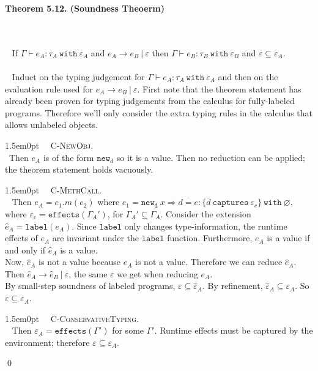 \documentclass{llncs}
\newcommand{\keywadj}[1]{\mathtt{#1}}
\newcommand{\keyw}[1]{\keywadj{#1}~}
\newcommand{\thm}[3]{
	\begin{large}
		\bf{#1}
	\end{large} \\\\
	\fbox{Statement.} ~ #2
	\fbox{Proof.}~ #3 \qed
}
\newcommand{\proofcase}[2]{
	\begin{adjustwidth}{1.5em}{0pt}
		\fbox{Case.}~~#1. \\ ~#2
	\end{adjustwidth}
}
\begin{document}
\thm{Theorem 5.12. (Soundness Theoerm)}
{If $\Gamma \vdash e_A : \tau_A~\keyw{with} \varepsilon_A$ and $e_A \longrightarrow e_B~|~\varepsilon$ then $\Gamma \vdash e_B : \tau_B~\keyw{with} \varepsilon_B$ and $\varepsilon \subseteq \varepsilon_A$.\\\\}
{Induct on the typing judgement for $\Gamma \vdash e_A : \tau_A~\keyw{with} \varepsilon_A$ and then on the evaluation rule used for $e_A \longrightarrow e_B~|~\varepsilon$. First note that the theorem statement has already been proven for typing judgements from the calculus for fully-labeled programs. Therefore we'll only consider the extra typing rules in the calculus that allows unlabeled objects.

\proofcase{\textsc{C-NewObj}}
{Then $e_A$ is of the form $\keywadj{new}_d$ so it is a value. Then no reduction can be applied; the theorem statement holds vacuously.
}

\proofcase{\textsc{C-MethCall}}
{
Then $e_A = e_1.m(e_2)$ where $e_1 = \keyw{new_d} x \Rightarrow \overline{d = e} : \{ \bar d~\keyw{captures} \varepsilon_c \}~ \keyw{with} \varnothing$, where $\varepsilon_c = \keywadj{effects}(\Gamma_A')$, for $\Gamma_A' \subseteq \Gamma_A$. Consider the extension $\hat e_A = \keywadj{label}(e_A)$. Since $\keywadj{label}$ only changes type-information, the runtime effects of $e_A$ are invariant under the $\keywadj{label}$ function. Furthermore, $e_A$ is a value if and only if $\hat e_A$ is a value.\\

\noindent
Now, $\hat e_A$ is not a value because $e_A$ is not a value. Therefore we can reduce $\hat e_A$. Then $\hat e_A \longrightarrow \hat e_B~|~\varepsilon$, the same $\varepsilon$ we get when reducing $e_A$. \\

\noindent
By small-step soundness of labeled programs, $\varepsilon \subseteq \hat \varepsilon_A$. By refinement, $\hat \varepsilon_A \subseteq \varepsilon_A$. So $\varepsilon \subseteq \varepsilon_A$.
}

\proofcase{\textsc{C-ConservativeTyping}}
{
Then $\varepsilon_A = \keywadj{effects}(\Gamma')$ for some $\Gamma'$. Runtime effects must be captured by the environment; therefore $\varepsilon \subseteq \varepsilon_A$.
}
}

%
%

	
\end{document}
